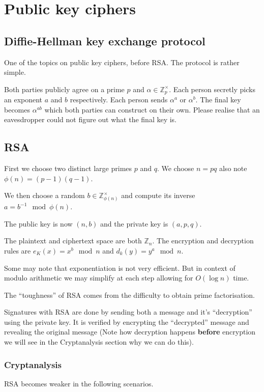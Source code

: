 \documentclass{report}
\begin{document}
\chapter{Public key ciphers}
\section{Diffie-Hellman key exchange protocol}
One of the topics on public key ciphers, before RSA\@.
The protocol is rather simple.

Both parties publicly agree on a prime $p$ and
$\alpha \in \mathbb{Z}_p^\times$. Each person secretly picks an exponent $a$
and $b$ respectively. Each person sends $\alpha^a$ or $\alpha^b$. The final
key becomes $\alpha^{ab}$ which both parties can construct on their own.
Please realise that an eavesdropper could not figure out
what the final key is.

\section{RSA}
First we choose two distinct large primes $p$ and $q$. We choose
$n = pq$ also note $\phi(n) = (p-1)(q-1)$.

We then choose a random $b \in \mathbb{Z}^\times_{\phi(n)}$ and compute
its inverse $a = b^{-1} \mod \phi(n)$.

The public key is now $(n,b)$ and the private key is $(a,p,q)$.

The plaintext and ciphertext space are both $\mathbb{Z}_n$. The encryption
and decryption rules are $e_K(x) = x^b \mod n$ and $d_k(y) = y^a \mod n$.

Some may note that exponentiation is not very efficient. But in context of
modulo arithmetic we may simplify at each step allowing for $O(\log n)$ time.

The ``toughness'' of RSA comes from the difficulty to obtain prime
factorisation.

Signatures with RSA are done by sending both a message and it's
``decryption'' using the private key. It is verified by encrypting the
``decrypted'' message and revealing the original message
(Note how decryption happens \textbf{before} encryption
we will see in the Cryptanalysis section why we can do this).

\subsection{Cryptanalysis}
RSA becomes weaker in the following scenarios.
\end{document}
